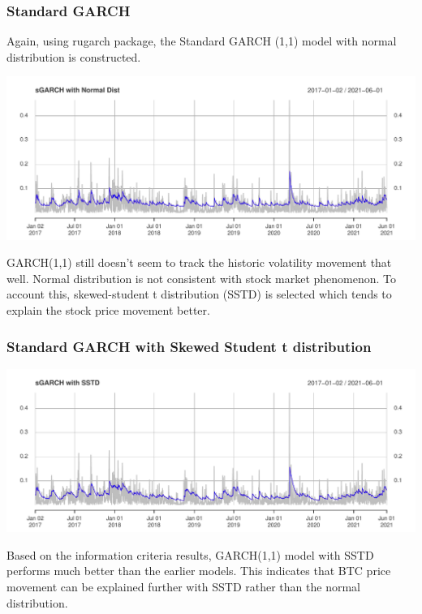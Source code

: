 \documentclass[
  11pt,
]{article}
\begin{document}
\hypertarget{standard-garch}{%
\subsubsection{Standard GARCH}\label{standard-garch}}

Again, using rugarch package, the Standard GARCH (1,1) model with normal
distribution is constructed.

\includegraphics{ST436_Project_files/figure-latex/unnamed-chunk-23-1.pdf}

GARCH(1,1) still doesn't seem to track the historic volatility movement
that well. Normal distribution is not consistent with stock market
phenomenon. To account this, skewed-student t distribution (SSTD) is
selected which tends to explain the stock price movement better.

\hypertarget{standard-garch-with-skewed-student-t-distribution}{%
\subsubsection{Standard GARCH with Skewed Student t
distribution}\label{standard-garch-with-skewed-student-t-distribution}}

\includegraphics{ST436_Project_files/figure-latex/unnamed-chunk-24-1.pdf}

Based on the information criteria results, GARCH(1,1) model with SSTD
performs much better than the earlier models. This indicates that BTC
price movement can be explained further with SSTD rather than the normal
distribution.
\end{document}
